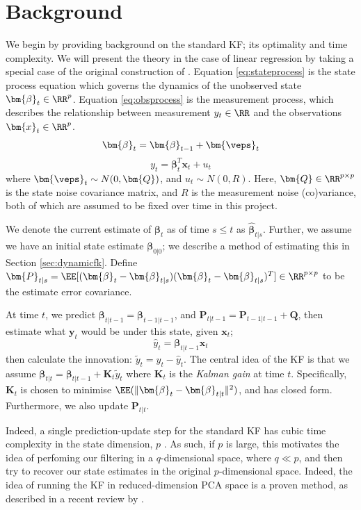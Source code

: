 \section{Background}
We begin by providing background on the standard KF; its optimality and time complexity. We will present the theory in the case of linear regression by taking a special case of the original construction of \cite{kalman1960}. Equation \ref{eq:stateprocess} is the state process equation which governs the dynamics of the unobserved state $\bm{\beta}_t \in \RR^p$. Equation \ref{eq:obsprocess} is the measurement process, which describes the relationship between measurement $y_t \in \RR$ and the observations $\bm{x}_t\in \RR^p$.
\begin{equation}\label{eq:stateprocess}
    \bm{\beta}_t=\bm{\beta}_{t-1}+\bm{\veps}_t
\end{equation}
\begin{equation}\label{eq:obsprocess}
    y_t=\bm{\beta}_t^T\bm{x}_t+u_t
\end{equation}
where $\bm{\veps}_t \sim N(0, \bm{Q})$, and $u_t \sim N(0, R)$. Here, $\bm{Q}\in \RR^{p\times p}$ is the state noise covariance matrix, and $R$ is the measurement noise (co)variance, both of which are assumed to be fixed over time in this project.

We denote the current estimate of $\bm{\beta}_{t}$ as of time $s\le t$ as $\hat{\bm{\beta}}_{t|s}$. Further, we assume we have an initial state estimate $\bm{\beta}_{0|0}$; we describe a method of estimating this in Section \ref{sec:dynamicfk}. Define $\bm{P}_{t|s}=\EE[(\bm{\beta}_t-\bm{\beta}_{t|s})(\bm{\beta}_t-\bm{\beta}_{t|s})^T] \in \RR^{p \times p}$ to be the estimate error covariance.

At time $t$, we predict $\bm{\beta}_{t|t-1} = \bm{\beta}_{t-1|t-1}$, and $\bm{P}_{t|t-1} = \bm{P}_{t-1|t-1} + \bm{Q}$, then estimate what $\bm{y}_t$ would be under this state, given $\bm{x}_t$;
\[
\hat{y}_{t} = \bm{\beta}_{t|t-1} \bm{x}_t    
\]
then calculate the innovation: $\tilde{y}_t = y_t - \hat{y}_t$. The central idea of the KF is that we assume $\bm{\beta}_{t|t}=\bm{\beta}_{t|t-1} + \bm{K}_t \tilde{y}_t$ where $\bm{K}_t$ is the \textit{Kalman gain} at time $t$. Specifically, $\bm{K}_t$ is chosen to minimise $\EE(\|\bm{\beta}_t - \bm{\beta}_{t|t}\|^2)$, and has closed form. Furthermore, we also update $\bm{P}_{t|t}$.

Indeed, a single prediction-update step for the standard KF has cubic time complexity in the state dimension, $p$ \cite{schmidt2024rankreducedkalmanfilterapproximate}.  As such, if $p$ is large, this motivates the idea of perfoming our filtering in a $q$-dimensional space, where $q\ll p$, and then try to recover our state estimates in the original $p$-dimensional space.
 Indeed, the idea of running the KF in reduced-dimension PCA space is a proven method, as described in a recent review by \textcite{Li_Li_Gao_Gao_2026}. 